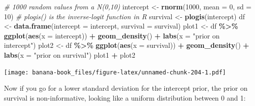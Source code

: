 \documentclass[
  12pt,
]{krantz}
\newenvironment{Shaded}{\begin{snugshade}}{\end{snugshade}}
\newcommand{\AttributeTok}[1]{\textcolor[rgb]{0.13,0.29,0.53}{#1}}
\newcommand{\CommentTok}[1]{\textcolor[rgb]{0.56,0.35,0.01}{\textit{#1}}}
\newcommand{\DecValTok}[1]{\textcolor[rgb]{0.00,0.00,0.81}{#1}}
\newcommand{\FunctionTok}[1]{\textcolor[rgb]{0.13,0.29,0.53}{\textbf{#1}}}
\newcommand{\NormalTok}[1]{#1}
\newcommand{\OtherTok}[1]{\textcolor[rgb]{0.56,0.35,0.01}{#1}}
\newcommand{\SpecialCharTok}[1]{\textcolor[rgb]{0.81,0.36,0.00}{\textbf{#1}}}
\newcommand{\StringTok}[1]{\textcolor[rgb]{0.31,0.60,0.02}{#1}}
\begin{document}
\begin{Shaded}
\begin{Highlighting}[]
\CommentTok{\# 1000 random values from a N(0,10)}
\NormalTok{intercept }\OtherTok{\textless{}{-}} \FunctionTok{rnorm}\NormalTok{(}\DecValTok{1000}\NormalTok{, }\AttributeTok{mean =} \DecValTok{0}\NormalTok{, }\AttributeTok{sd =} \DecValTok{10}\NormalTok{) }
\CommentTok{\# plogis() is the inverse{-}logit function in R}
\NormalTok{survival }\OtherTok{\textless{}{-}} \FunctionTok{plogis}\NormalTok{(intercept) }
\NormalTok{df }\OtherTok{\textless{}{-}} \FunctionTok{data.frame}\NormalTok{(}\AttributeTok{intercept =}\NormalTok{ intercept, }\AttributeTok{survival =}\NormalTok{ survival)}
\NormalTok{plot1 }\OtherTok{\textless{}{-}}\NormalTok{ df }\SpecialCharTok{\%\textgreater{}\%}
  \FunctionTok{ggplot}\NormalTok{(}\FunctionTok{aes}\NormalTok{(}\AttributeTok{x =}\NormalTok{ intercept)) }\SpecialCharTok{+}
  \FunctionTok{geom\_density}\NormalTok{() }\SpecialCharTok{+}
  \FunctionTok{labs}\NormalTok{(}\AttributeTok{x =} \StringTok{"prior on intercept"}\NormalTok{)}
\NormalTok{plot2 }\OtherTok{\textless{}{-}}\NormalTok{ df }\SpecialCharTok{\%\textgreater{}\%}
  \FunctionTok{ggplot}\NormalTok{(}\FunctionTok{aes}\NormalTok{(}\AttributeTok{x =}\NormalTok{ survival)) }\SpecialCharTok{+}
  \FunctionTok{geom\_density}\NormalTok{() }\SpecialCharTok{+}
  \FunctionTok{labs}\NormalTok{(}\AttributeTok{x =} \StringTok{"prior on survival"}\NormalTok{)}
\NormalTok{plot1 }\SpecialCharTok{+}\NormalTok{ plot2}
\end{Highlighting}
\end{Shaded}

\texttt{[image: banana-book\_files/figure-latex/unnamed-chunk-204-1.pdf]}

Now if you go for a lower standard deviation for the intercept prior, the prior on survival is non-informative, looking like a uniform distribution between 0 and 1:
\end{document}
